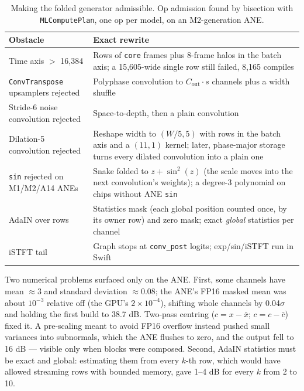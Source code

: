\documentclass[11pt]{article}
\newcommand{\code}[1]{\texttt{#1}}
\begin{document}
\begin{table}[h]
\centering
\small
\caption{Making the folded generator admissible. Op admission found by bisection with \code{MLComputePlan}, one op per model, on an M2-generation ANE.}
\label{tab:cs1-fold-ops}
\begin{tabularx}{\linewidth}{lX}
\toprule
Obstacle & Exact rewrite \\
\midrule
Time axis $>$ 16,384 & Rows of \code{core} frames plus 8-frame halos in the batch axis; a 15,605-wide single row still failed, 8,165 compiles \\
\code{ConvTranspose} upsamplers rejected & Polyphase convolution to $C_\text{out}\cdot s$ channels plus a width shuffle \\
Stride-6 noise convolution rejected & Space-to-depth, then a plain convolution \\
Dilation-5 convolution rejected & Reshape width to $(W/5, 5)$ with rows in the batch axis and a $(11,1)$ kernel; later, phase-major storage turns every dilated convolution into a plain one \\
\code{sin} rejected on M1/M2/A14 ANEs & Snake folded to $z + \sin^2(z)$ (the scale moves into the next convolution's weights); a degree-3 polynomial on chips without ANE \code{sin} \\
AdaIN over rows & Statistics mask (each global position counted once, by its owner row) and zero mask; exact \emph{global} statistics per channel \\
iSTFT tail & Graph stops at \code{conv\_post} logits; exp/sin/iSTFT run in Swift \\
\bottomrule
\end{tabularx}
\end{table}

Two numerical problems surfaced only on the ANE. First, some channels have mean $\approx$3 and standard deviation $\approx$0.08; the ANE's FP16 masked mean was about $10^{-3}$ relative off (the GPU's $2\times10^{-4}$), shifting whole channels by 0.04$\sigma$ and holding the first build to 38.7 dB. Two-pass centring ($c = x - \bar x$; $c = c - \bar c$) fixed it. A pre-scaling meant to avoid FP16 overflow instead pushed small variances into subnormals, which the ANE flushes to zero, and the output fell to 16 dB --- visible only when blocks were composed. Second, AdaIN statistics must be exact and global: estimating them from every $k$-th row, which would have allowed streaming rows with bounded memory, gave 1--4 dB for every $k$ from 2 to 10.
\end{document}
